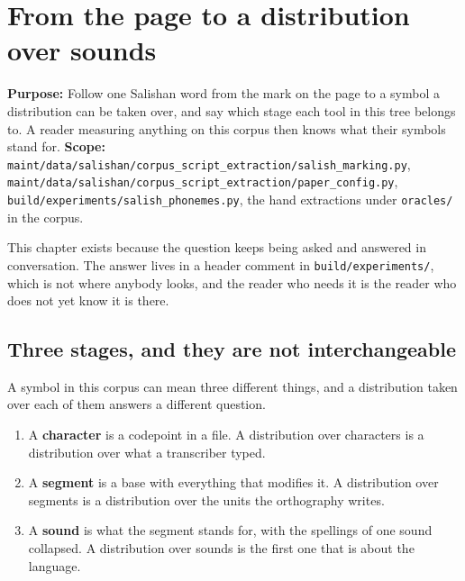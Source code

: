 \chapter{From the page to a distribution over sounds}

\textbf{Purpose:} Follow one Salishan word from the mark on the page to a symbol a distribution can
be taken over, and say which stage each tool in this tree belongs to. A reader measuring
anything on this corpus then knows what their symbols stand for.
\textbf{Scope:}
\texttt{maint/\allowbreak{}data/\allowbreak{}salishan/\allowbreak{}corpus\_\allowbreak{}script\_\allowbreak{}extraction/\allowbreak{}salish\_\allowbreak{}marking.\allowbreak{}py},
\texttt{maint/\allowbreak{}data/\allowbreak{}salishan/\allowbreak{}corpus\_\allowbreak{}script\_\allowbreak{}extraction/\allowbreak{}paper\_\allowbreak{}config.\allowbreak{}py},
\texttt{build/\allowbreak{}experiments/\allowbreak{}salish\_\allowbreak{}phonemes.\allowbreak{}py},
the hand extractions under \texttt{oracles/\allowbreak{}} in the corpus.

This chapter exists because the question keeps being asked and answered in conversation. The answer
lives in a header comment in \texttt{build/\allowbreak{}experiments/\allowbreak{}}, which is not
where anybody looks, and the reader who needs it is the reader who does not yet know it is there.

\section{Three stages, and they are not interchangeable}

A symbol in this corpus can mean three different things, and a distribution taken over each of them
answers a different question.

\begin{enumerate}
  \item A \textbf{character} is a codepoint in a file. A distribution over characters is a
        distribution over what a transcriber typed.
  \item A \textbf{segment} is a base with everything that modifies it. A distribution over segments
        is a distribution over the units the orthography writes.
  \item A \textbf{sound} is what the segment stands for, with the spellings of one sound collapsed.
        A distribution over sounds is the first one that is about the language.
\end{enumerate}

